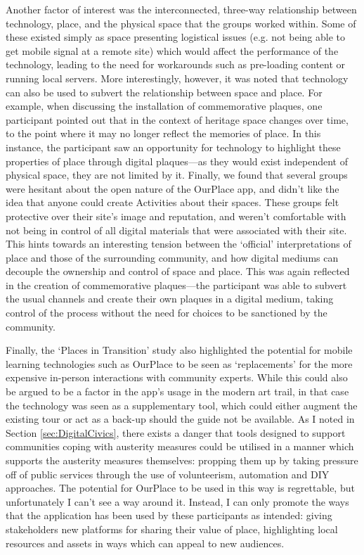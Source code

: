 Another factor of interest was the interconnected, three-way relationship between technology, place, and the physical space that the groups worked within. Some of these existed simply as space presenting logistical issues (e.g. not being able to get mobile signal at a remote site) which would affect the performance of the technology, leading to the need for workarounds such as pre-loading content or running local servers. More interestingly, however, it was noted that technology can also be used to subvert the relationship between space and place. For example, when discussing the installation of commemorative plaques, one participant pointed out that in the context of heritage space changes over time, to the point where it may no longer reflect the memories of place. In this instance, the participant saw an opportunity for technology to highlight these properties of place through digital plaques---as they would exist independent of physical space, they are not limited by it. Finally, we found that several groups were hesitant about the open nature of the OurPlace app, and didn't like the idea that anyone could create Activities about their spaces. These groups felt protective over their site's image and reputation, and weren't comfortable with not being in control of all digital materials that were associated with their site. This hints towards an interesting tension between the `official' interpretations of place and those of the surrounding community, and how digital mediums can decouple the ownership and control of space and place. This was again reflected in the creation of commemorative plaques---the participant was able to subvert the usual channels and create their own plaques in a digital medium, taking control of the process without the need for choices to be sanctioned by the community.  

Finally, the `Places in Transition' study also highlighted the potential for mobile learning technologies such as OurPlace to be seen as `replacements' for the more expensive in-person interactions with community experts. While this could also be argued to be a factor in the app's usage in the modern art trail, in that case the technology was seen as a supplementary tool, which could either augment the existing tour or act as a back-up should the guide not be available. As I noted in Section \ref{sec:DigitalCivics}, there exists a danger that tools designed to support communities coping with austerity measures could be utilised in a manner which supports the austerity measures themselves: propping them up by taking pressure off of public services through the use of volunteerism, automation and DIY approaches. The potential for OurPlace to be used in this way is regrettable, but unfortunately I can't see a way around it. Instead, I can only promote the ways that the application has been used by these participants as intended: giving stakeholders new platforms for sharing their value of place, highlighting local resources and assets in ways which can appeal to new audiences.

